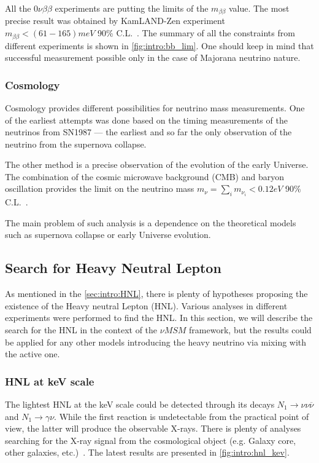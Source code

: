 \documentclass[../main.tex]{subfiles}
\begin{document}
All the $0\nu\beta\beta$ experiments are putting the limits of the $m_{\beta\beta}$ value. The most precise result was obtained by KamLAND-Zen experiment $m_{\beta\beta} < (61-165) meV$ 90\% C.L.~\cite{Gando2016}. The summary of all the constraints from different experiments is shown in \autoref{fig:intro:bb_lim}. One should keep in mind that successful measurement possible only in the case of Majorana neutrino nature.

\subsubsection{Cosmology}
Cosmology provides different possibilities for neutrino mass measurements. One of the earliest attempts was done based on the timing measurements of the neutrinos from SN1987 --- the earliest and so far the only observation of the neutrino from the supernova collapse.

The other method is a precise observation of the evolution of the early Universe. The combination of the cosmic microwave background (CMB) and baryon oscillation provides the limit on the neutrino mass $m_\nu=\sum_i m_{\nu_i}<0.12eV$ 90\% C.L.~\cite{Palanque-Delabrouille2015}.

The main problem of such analysis is a dependence on the theoretical models such as supernova collapse or early Universe evolution.

\subsection{Search for Heavy Neutral Lepton}
\label{sec:intro:HNL_exp}
As mentioned in the \autoref{sec:intro:HNL}, there is plenty of hypotheses proposing the existence of the Heavy neutral Lepton (HNL). Various analyses in different experiments were performed to find the HNL. In this section, we will describe the search for the HNL in the context of the $\nu MSM$ framework, but the results could be applied for any other models introducing the heavy neutrino via mixing with the active one.

\subsubsection{HNL at keV scale}
The lightest HNL at the keV scale could be detected through its decays $N_1\to \nu\nu\overline{\nu}$ and $N_1\to\gamma\nu$. While the first reaction is undetectable from the practical point of view, the latter will produce the observable X-rays. There is plenty of analyses searching for the X-ray signal from the cosmological object (e.g. Galaxy core, other galaxies, etc.)~\cite{Ng2019, Perez2017}. The latest results are presented in \autoref{fig:intro:hnl_kev}.
\end{document}
